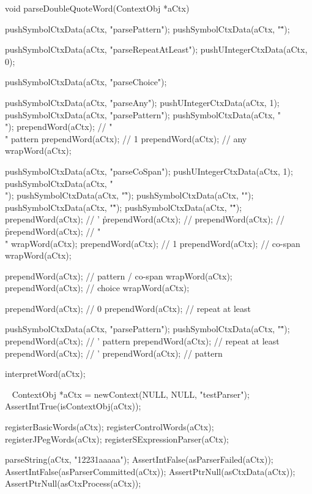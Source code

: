 \startCCode
void parseDoubleQuoteWord(ContextObj *aCtx) {

  pushSymbolCtxData(aCtx, "parsePattern");
  pushSymbolCtxData(aCtx, "\"");

  pushSymbolCtxData(aCtx, "parseRepeatAtLeast");
  pushUIntegerCtxData(aCtx, 0);

  pushSymbolCtxData(aCtx, "parseChoice");

  pushSymbolCtxData(aCtx, "parseAny");
  pushUIntegerCtxData(aCtx, 1);
  pushSymbolCtxData(aCtx, "parsePattern");
  pushSymbolCtxData(aCtx, "\\");
  prependWord(aCtx);  // "\\" pattern
  prependWord(aCtx);  // 1
  prependWord(aCtx);  // any
  wrapWord(aCtx);

  pushSymbolCtxData(aCtx, "parseCoSpan");
  pushUIntegerCtxData(aCtx, 1);
  pushSymbolCtxData(aCtx, "\\");
  pushSymbolCtxData(aCtx, "\f");
  pushSymbolCtxData(aCtx, "\n");
  pushSymbolCtxData(aCtx, "\r");
  pushSymbolCtxData(aCtx, "\"");
  prependWord(aCtx);  // ' \r
  prependWord(aCtx);  // \n
  prependWord(aCtx);  // \f
  prependWord(aCtx);  // "\\"
  wrapWord(aCtx);
  prependWord(aCtx);  // 1
  prependWord(aCtx);  // co-span
  wrapWord(aCtx);
  
  prependWord(aCtx);  // pattern / co-span
  wrapWord(aCtx);
  prependWord(aCtx);  // choice
  wrapWord(aCtx);
  
  prependWord(aCtx);  // 0
  prependWord(aCtx);  // repeat at least

  pushSymbolCtxData(aCtx, "parsePattern");
  pushSymbolCtxData(aCtx, "\"");
  prependWord(aCtx);  // ' pattern
  prependWord(aCtx);  // repeat at least
  prependWord(aCtx);  // '
  prependWord(aCtx);  // pattern

  interpretWord(aCtx);
}
\stopCCode

\CTestsSuiteSetup\
\startCTest
  ContextObj *aCtx = newContext(NULL, NULL, "testParser");
  AssertIntTrue(isContextObj(aCtx));
  
  registerBasicWords(aCtx);
  registerControlWords(aCtx);
  registerJPegWords(aCtx);
  registerSExpressionParser(aCtx);
\stopCTest

\startCTest
  parseString(aCtx, "12231aaaaa");
  AssertIntFalse(asParserFailed(aCtx));
  AssertIntFalse(asParserCommitted(aCtx));
  AssertPtrNull(asCtxData(aCtx));
  AssertPtrNull(asCtxProcess(aCtx));

